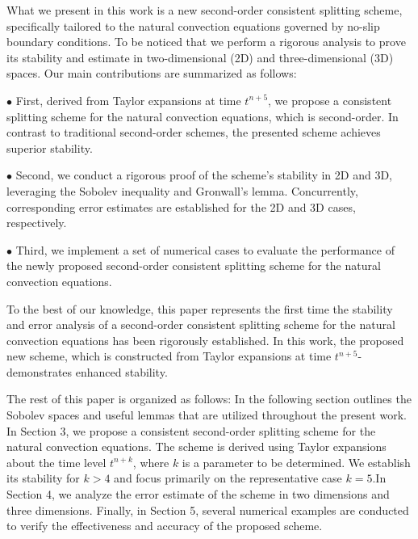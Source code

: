 \documentclass[10pt]{article}
\begin{document}
	
	What we present in this work is a new second-order consistent splitting scheme, specifically tailored to the natural convection equations governed by no-slip boundary conditions. To be noticed that we perform a rigorous analysis to prove its stability and estimate in two-dimensional (2D) and  three-dimensional (3D) spaces. Our main contributions are summarized as follows:
	
	\indent$\bullet$ First, derived from Taylor expansions at time \( t^{n+5} \), we propose a consistent splitting scheme for the natural convection equations, which is second-order. In contrast to traditional second-order schemes, the presented scheme achieves superior stability.
	
	\indent$\bullet$ Second, we conduct a rigorous proof of the scheme’s  stability in 2D and 3D, leveraging the Sobolev inequality and Gronwall’s lemma. Concurrently, corresponding  error estimates are established for the 2D and 3D cases, respectively.
	
	\indent$\bullet$ Third, we implement a set of numerical cases to evaluate the performance of the newly proposed second-order consistent splitting scheme for the natural convection equations. 
	
	To the best of our knowledge, this paper represents the first time the stability and error analysis of a second-order consistent splitting scheme for the natural convection equations has been rigorously established. In this work, the proposed new scheme, which is constructed from Taylor expansions at time \( t^{n+5} \)-demonstrates enhanced stability.  
	
	
	The rest of this paper is organized as follows: In the following section outlines the Sobolev spaces and useful lemmas that are utilized throughout the present work. In Section 3, we propose a consistent second-order splitting scheme for the natural convection equations. The scheme is derived using Taylor expansions about the time level $t^{n+k}$, where $k$ is a parameter to be determined. We establish its  stability for $k>4$ and focus primarily on the representative case $k=5$.In Section 4, we analyze the error estimate of the scheme in two dimensions and three dimensions. Finally, in Section 5, several numerical examples are conducted to verify the effectiveness and accuracy of the proposed scheme.
	
\end{document}
